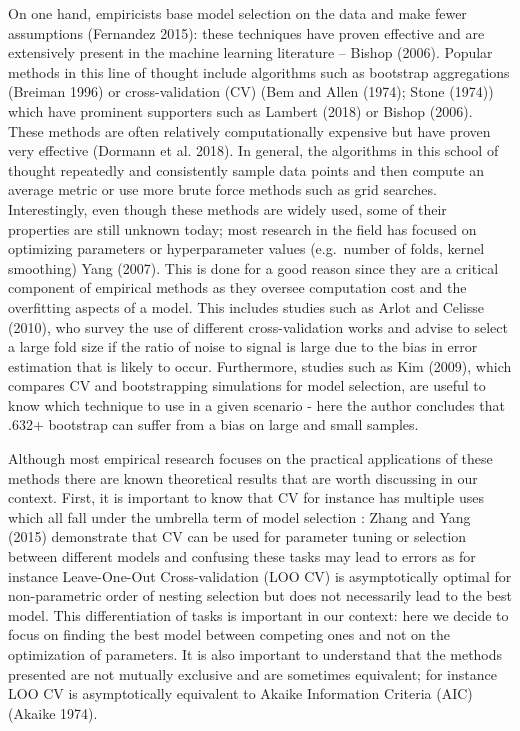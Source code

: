 \documentclass[12pt,]{article}
\begin{document}
On one hand, empiricists base model selection on the data and make fewer assumptions (Fernandez 2015): these techniques have proven effective and are extensively present in the machine learning literature -- Bishop (2006). Popular methods in this line of thought include algorithms such as bootstrap aggregations (Breiman 1996) or cross-validation (CV) (Bem and Allen (1974); Stone (1974)) which have prominent supporters such as Lambert (2018) or Bishop (2006). These methods are often relatively computationally expensive but have proven very effective (Dormann et al. 2018). In general, the algorithms in this school of thought repeatedly and consistently sample data points and then compute an average metric or use more brute force methods such as grid searches. Interestingly, even though these methods are widely used, some of their properties are still unknown today; most research in the field has focused on optimizing parameters or hyperparameter values (e.g.~number of folds, kernel smoothing) Yang (2007). This is done for a good reason since they are a critical component of empirical methods as they oversee computation cost and the overfitting aspects of a model. This includes studies such as Arlot and Celisse (2010), who survey the use of different cross-validation works and advise to select a large fold size if the ratio of noise to signal is large due to the bias in error estimation that is likely to occur. Furthermore, studies such as Kim (2009), which compares CV and bootstrapping simulations for model selection, are useful to know which technique to use in a given scenario - here the author concludes that .632+ bootstrap can suffer from a bias on large and small samples.

Although most empirical research focuses on the practical applications of these methods there are known theoretical results that are worth discussing in our context. First, it is important to know that CV for instance has multiple uses which all fall under the umbrella term of model selection : Zhang and Yang (2015) demonstrate that CV can be used for parameter tuning or selection between different models and confusing these tasks may lead to errors as for instance Leave-One-Out Cross-validation (LOO CV) is asymptotically optimal for non-parametric order of nesting selection but does not necessarily lead to the best model. This differentiation of tasks is important in our context: here we decide to focus on finding the best model between competing ones and not on the optimization of parameters. It is also important to understand that the methods presented are not mutually exclusive and are sometimes equivalent; for instance LOO CV is asymptotically equivalent to Akaike Information Criteria (AIC) (Akaike 1974).
\end{document}
